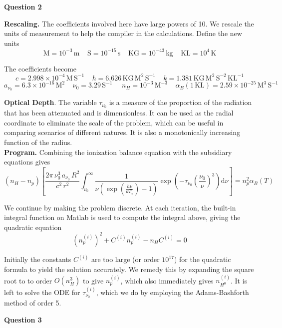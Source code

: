 \documentclass[12pt]{extarticle}
\begin{document}
\begin{center}
\textbf{Question 2}
\end{center}

\textbf{Rescaling.} The coefficients involved here have large powers of 10. We rescale the units of measurement to help the compiler in the calculations. Define the new units
$$\mathrm{M} = 10^{-3}\,\mathrm{m}\;\;\;\; \mathrm{S} = 10^{-15}\,\mathrm{s}\;\;\;\; \mathrm{KG} = 10^{-43}\,\mathrm{kg}\;\;\;\; \mathrm{KL} = 10^{4}\,\mathrm{K}$$ 

The coefficients become
$$c = 2.998 \times 10^{-4}\,\mathrm{M\,S^{-1}}\;\;\;\;h = 6.626\,\mathrm{KG\,M^2\,S^{-1}}\;\;\;\;k = 1.381\,\mathrm{KG\,M^2\,S^{-2}\,KL^{-1}}$$
$$a_{\nu_0} = 6.3 \times 10^{-16}\,\mathrm{M^2}\;\;\;\;\nu_0 = 3.29\, \mathrm{S^{-1}}\;\;\;\;\ n_H= 10^{-3}\,\mathrm{M^{-3}}\;\;\;\;\alpha_B (1 \,\mathrm{KL}) = 2.59 \times 10^{-25}\,\mathrm{M^3\,S^{-1}}$$

\textbf{Optical Depth}. The variable $\tau_{\nu_0}$ is a measure of the proportion of the radiation that has been attenuated and is dimensionless. It can be used as the radial coordinate to eliminate the scale of the problem, which can be useful in comparing scenarios of different natures. It is also a monotonically increasing function of the radius.\\

\textbf{Program.} Combining the ionization balance equation with the subsidiary equations gives
$$(n_H-n_p)\left[\frac{2\pi\,\nu_0^3\,a_{\nu_0}\,R^2}{c^2\,r^2}\int_{\nu_0}^\infty \frac{1}{\nu(\exp(\frac{h \nu}{k T_{\star}})-1)}\exp\left(-\tau_{\nu_0}\left(\frac{\nu_0}{\nu}\right)^3\right)\mathrm{d}\nu\right] = n_p^2\alpha_B(T)$$

We continue by making the problem discrete. At each iteration, the built-in integral function on Matlab is used to compute the integral above, giving the quadratic equation
$$(n_p^{(i)})^2+C^{(i)}n_p^{(i)}-n_H C^{(i)} = 0$$

Initially the constants $C^{(i)}$ are too large (or order $10^{17}$) for the quadratic formula to yield the solution accurately. We remedy this by expanding the square root to to order $O(n_H^3)$ to give $n_p^{(i)}$, which also immediately gives $n_{H^0}^{(i)}$. It is left to solve the ODE for $\tau_{\nu_0}^{(i)}$, which we do by employing the Adams-Bashforth method of order 5.\\
 
\begin{center}
\textbf{Question 3}
\end{center}
\end{document}
